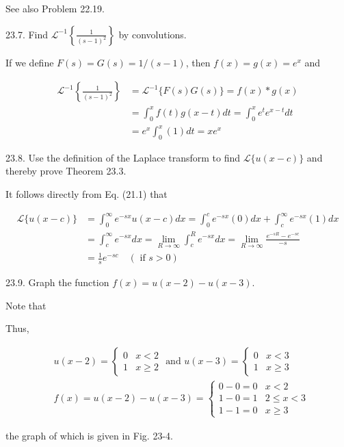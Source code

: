 \documentclass[10pt]{article}
\begin{document}
See also Problem 22.19.

23.7. Find $\mathscr{L}^{-1}\left\{\frac{1}{(s-1)^{2}}\right\}$ by convolutions.

If we define $F(s)=G(s)=1 /(s-1)$, then $f(x)=g(x)=e^{x}$ and

$$
\begin{aligned}
\mathscr{L}^{-1}\left\{\frac{1}{(s-1)^{2}}\right\} & =\mathscr{L}^{-1}\{F(s) G(s)\}=f(x) * g(x) \\
& =\int_{0}^{x} f(t) g(x-t) d t=\int_{0}^{x} e^{t} e^{x-t} d t \\
& =e^{x} \int_{0}^{x}(1) d t=x e^{x}
\end{aligned}
$$

23.8. Use the definition of the Laplace transform to find $\mathscr{L}\{u(x-c)\}$ and thereby prove Theorem 23.3.

It follows directly from Eq. (21.1) that

$$
\begin{aligned}
\mathscr{L}\{u(x-c)\} & =\int_{0}^{\infty} e^{-s x} u(x-c) d x=\int_{0}^{c} e^{-s x}(0) d x+\int_{c}^{\infty} e^{-s x}(1) d x \\
& =\int_{c}^{\infty} e^{-s x} d x=\lim _{R \rightarrow \infty} \int_{c}^{R} e^{-s x} d x=\lim _{R \rightarrow \infty} \frac{e^{-s R}-e^{-s c}}{-s} \\
& =\frac{1}{s} e^{-s c} \quad(\text { if } s>0)
\end{aligned}
$$

23.9. Graph the function $f(x)=u(x-2)-u(x-3)$.

Note that

Thus,

$$
\begin{aligned}
& u(x-2)=\left\{\begin{array}{ll}
0 & x<2 \\
1 & x \geq 2
\end{array} \text { and } u(x-3)= \begin{cases}0 & x<3 \\
1 & x \geq 3\end{cases} \right. \\
& f(x)=u(x-2)-u(x-3)=\left\{\begin{array}{lr}
0-0=0 & x<2 \\
1-0=1 & 2 \leq x<3 \\
1-1=0 & x \geq 3
\end{array}\right.
\end{aligned}
$$

the graph of which is given in Fig. 23-4.
\end{document}
